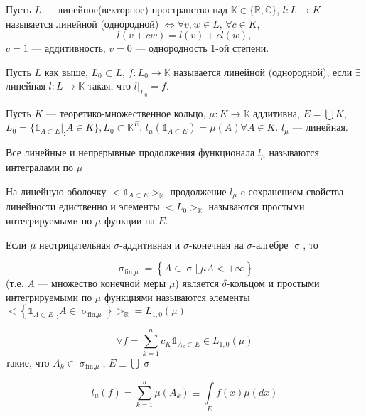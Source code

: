 \documentclass[a4paper, 12pt]{article}
\begin{document}
\begin{definition}
    Пусть $L$ --- линейное(векторное) пространство над $\mathbb{K} \in \{\mathbb{R}, \mathbb{C}\}$, $l:L \rightarrow K$ называется линейной (однородной) $\Leftrightarrow \forall v, w \in L, \, \forall c \in K$, 
    $$l(v + cw) = l(v) + cl(w),$$ 
    $c = 1$ --- аддитивность, $v = 0$ --- однородность 1-ой степени.
\end{definition}

\begin{definition}
    Пусть $L$ как выше, $L_0 \subset L$, $f: L_0  \rightarrow \mathbb{K}$ называется линейной (однородной), если $\exists$ линейная $l: L \rightarrow \mathbb{K}$ такая, что $l \big|_{L_0} = f$.
\end{definition}

\begin{problem}
    Пусть $K$ --- теоретико-множественное кольцо, $\mu: K \rightarrow \mathbb{K}$ аддитивна, $E = \bigcup K$, $L_0 = \{ \mathds{1}_{A \subset E} \big|_: A \in K\}, L_0 \subset \mathbb{K}^E$, $l_{\mu} (\mathds{1}_{A \subset E} ) = \mu (A) \forall A \in K$. $l_{\mu}$ --- линейная.
\end{problem}

\begin{definition}
    Все линейные и непрерывные продолжения функционала $l_{\mu}$ называются интегралами по $\mu$
\end{definition}

\begin{problem}
    На линейную оболочку $<\mathds{1}_{A \subset E}>_{\mathbb{K}}$ продолжение $l_{\mu}$ c сохранением свойства линейности едиственно и элементы $<L_0>_{\mathbb{K}}$ называются простыми интегрируемыми по $\mu$ функции на $E$.
\end{problem}

Если $\mu$ неотрицательная $\sigma$-аддитивная и $\sigma$-конечная на $\sigma$-алгебре $\upsigma$, то 

$$\upsigma_{\text{fin,$\mu$}} = \left\{ A \in \upsigma \big|_: \mu A < + \infty \right\}$$
(т.е. $A$ --- множество конечной меры $\mu$) является $\delta$-кольцом и простыми интегрируемыми по $\mu$ функциями называются элементы $<\left\{ \mathds{1}_{A \subset E} \big|_: A \in \upsigma_{\text{fin,$\mu$}}  \right\}>_{\mathbb{R}} = L_{1, 0} (\mu)$

$$\forall f = \sum \limits_{k = 1}^{n} c_K \mathds{1}_{A_k \subset E} \in L_{1, 0}(\mu)$$ 
такие, что $A_k \in \upsigma_{\text{fin,$\mu$}}$, $E \equiv \bigcup \upsigma $

$$ l_{\mu}(f) = \sum \limits_{k = 1}^{n} \mu(A_k) \equiv \int \limits_{E} f(x) \mu(dx)$$  
\end{document}
